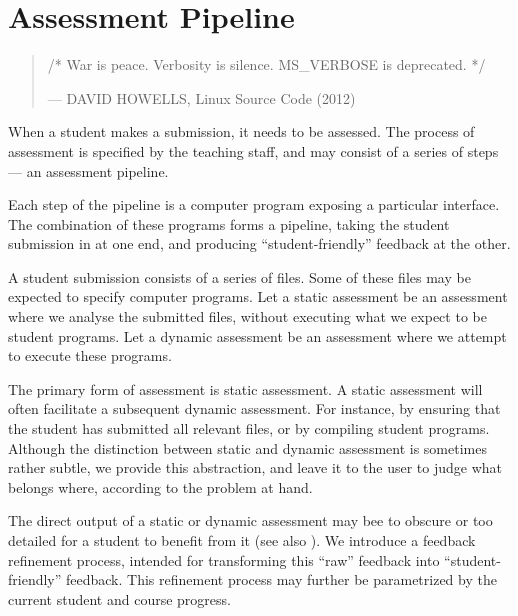 
\chapter{Assessment Pipeline}

\begin{quotation}

\footnotesize\sffamily\itshape

\begin{flushright}

/* War is peace. Verbosity is silence. MS\_VERBOSE is deprecated. */

\smallbreak

\upshape

--- DAVID HOWELLS, Linux Source Code (2012)

\end{flushright}

\end{quotation}

When a student makes a submission, it needs to be assessed. The process of
assessment is specified by the teaching staff, and may consist of a series of
steps --- an assessment pipeline.

Each step of the pipeline is a computer program exposing a particular
interface. The combination of these programs forms a pipeline, taking the
student submission in at one end, and producing ``student-friendly'' feedback
at the other.

A student submission consists of a series of files. Some of these files may be
expected to specify computer programs. Let a static assessment be an assessment
where we analyse the submitted files, without executing what we expect to be
student programs. Let a dynamic assessment be an assessment where we attempt to
execute these programs.

The primary form of assessment is static assessment. A static assessment will
often facilitate a subsequent dynamic assessment. For instance, by ensuring
that the student has submitted all relevant files, or by compiling student
programs.  Although the distinction between static and dynamic assessment is
sometimes rather subtle, we provide this abstraction, and leave it to the user
to judge what belongs where, according to the problem at hand.

The direct output of a static or dynamic assessment may bee to obscure or too
detailed for a student to benefit from it (see also
). We introduce a
feedback refinement process, intended for transforming this ``raw'' feedback
into ``student-friendly'' feedback. This refinement process may further be
parametrized by the current student and course progress.

